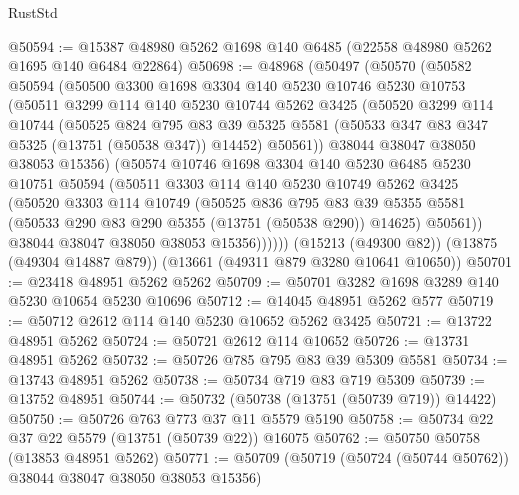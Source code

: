 \begin{lexlean}{RustStd}
\begin{coremodule}
@50594 := @15387 @48980 @5262 @1698 @140 @6485 (@22558 @48980 @5262 @1695 @140 @6484 @22864)
@50698 := @48968
    (@50497
      (@50570
        (@50582
          @50594
          (@50500
            @3300
            @1698
            @3304
            @140
            @5230
            @10746
            @5230
            @10753
            (@50511
              @3299
              @114
              @140
              @5230
              @10744
              @5262
              @3425
              (@50520
                @3299
                @114
                @10744
                (@50525
                  @824
                  @795
                  @83
                  @39
                  @5325
                  @5581
                  (@50533 @347 @83 @347 @5325 (@13751 (@50538 @347)) @14452)
                  @50561))
              @38044
              @38047
              @38050
              @38053
              @15356)
            (@50574
              @10746
              @1698
              @3304
              @140
              @5230
              @6485
              @5230
              @10751
              @50594
              (@50511
                @3303
                @114
                @140
                @5230
                @10749
                @5262
                @3425
                (@50520
                  @3303
                  @114
                  @10749
                  (@50525
                    @836
                    @795
                    @83
                    @39
                    @5355
                    @5581
                    (@50533 @290 @83 @290 @5355 (@13751 (@50538 @290)) @14625)
                    @50561))
                @38044
                @38047
                @38050
                @38053
                @15356))))))
    (@15213 (@49300 @82))
    (@13875 (@49304 @14887 @879))
    (@13661 (@49311 @879 @3280 @10641 @10650))
@50701 := @23418 @48951 @5262 @5262
@50709 := @50701 @3282 @1698 @3289 @140 @5230 @10654 @5230 @10696
@50712 := @14045 @48951 @5262 @577
@50719 := @50712 @2612 @114 @140 @5230 @10652 @5262 @3425
@50721 := @13722 @48951 @5262
@50724 := @50721 @2612 @114 @10652
@50726 := @13731 @48951 @5262
@50732 := @50726 @785 @795 @83 @39 @5309 @5581
@50734 := @13743 @48951 @5262
@50738 := @50734 @719 @83 @719 @5309
@50739 := @13752 @48951
@50744 := @50732 (@50738 (@13751 (@50739 @719)) @14422)
@50750 := @50726 @763 @773 @37 @11 @5579 @5190
@50758 := @50734 @22 @37 @22 @5579 (@13751 (@50739 @22)) @16075
@50762 := @50750 @50758 (@13853 @48951 @5262)
@50771 := @50709 (@50719 (@50724 (@50744 @50762)) @38044 @38047 @38050 @38053 @15356)

\end{coremodule}
\end{lexlean}
